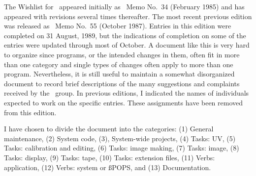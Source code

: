 
\def\stitle{\AIPS\ Wishlist}
\def\ftitle{The AIPS Wishlist}
\def\author{Eric W. Greisen}
\def\mdate{31 August 1989}
\def\memnumb{\phantom{9}}
\def\memnumc{\phantom{9}}
\memobegin


     The Wishlist for \AIPS\ appeared initially as \Aips\ Memo
No.~34 (February 1985) and has appeared with revisions several
times thereafter.  The most recent previous edition was released
as \AIPS\ Memo No.~55 (October 1987).  Entries in this edition were
completed on 31 August, 1989, but the indications of completion on
some of the entries were updated through most of October.  A document
like this is very hard to organize since programs, or the intended
changes in them, often fit in more than one category and single
types of changes often apply to more than one program.  Nevertheless,
it is still useful to maintain a somewhat disorganized document to
record brief descriptions of the many suggestions and complaints
received by the \AIPS\ group.  In previous editions, I indicated
the names of individuals expected to work on the specific entries.
These assignments have been removed from this edition.

     I have chosen to divide the document into the categories:
(1) General maintenance, (2) System code, (3), System-wide
projects, (4) Tasks: UV, (5) Tasks: calibration and editing,
(6) Tasks: image making, (7) Tasks: image, (8) Tasks: display,
(9) Tasks: tape, (10) Tasks: extension files, (11) Verbs:
application, (12) Verbs: system or {\ss POPS}, and (13)
Documentation.

